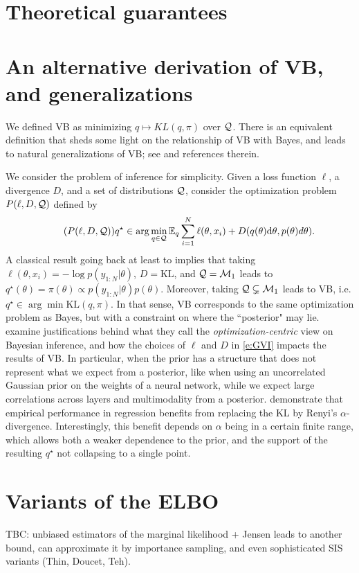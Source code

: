 \section{Theoretical guarantees}

\section{An alternative derivation of VB, and generalizations}
We defined VB as minimizing $q\mapsto KL(q,\pi)$ over $\mathcal{Q}$. 
There is an equivalent definition that sheds some light on the relationship of VB with Bayes, and leads to natural generalizations of VB; see \citep{KnJeDa22} and references therein.

We consider the problem of inference for simplicity. 
Given a loss function $\ell$, a divergence $D$, and a set of distributions $\mathcal{Q}$, consider the optimization problem $P(\ell, D, \mathcal{Q})$ defined by 
\begin{equation}
  \label{e:GVI}
  \tag{$P(\ell, D, \cQ)$}
  q^\star \in \arg\min_{q\in \cQ} \mathbb{E}_q \sum_{i=1}^N \ell(\theta, x_i) + D(q(\theta)\d\theta, p(\theta)d\theta).
\end{equation}
A classical result going back at least to \citep{DoVa75} implies that taking $\ell(\theta, x_i) = -\log p(y_{1:N}\vert \theta)$, $D=\text{KL}$, and $\mathcal{Q}=\mathcal{M}_1$ leads to $q^\star(\theta) = \pi(\theta) \propto p(y_{1:N}\vert\theta)p(\theta)$.
Moreover, taking $\mathcal{Q}\subsetneq \mathcal{M}_1$ leads to VB, i.e. $q^\star \in \arg\min \text{KL}(q,\pi)$.
In that sense, VB corresponds to the same optimization problem as Bayes, but with a constraint on where the ``posterior" may lie.  
\cite{KnJeDa22} examine justifications behind what they call the \emph{optimization-centric} view on Bayesian inference, and how the choices of $\ell$ and $D$ in \eqref{e:GVI} impacts the results of VB.
In particular, when the prior has a structure that does not represent what we expect from a posterior, like when using an uncorrelated Gaussian prior on the weights of a neural network, while we expect large correlations across layers and multimodality from a posterior.
\cite{KnJeDa22} demonstrate that empirical performance in regression benefits from replacing the KL by Renyi's $\alpha$-divergence. 
Interestingly, this benefit depends on $\alpha$ being in a certain finite range, which allows both a weaker dependence to the prior, and the support of the resulting $q^\star$ not collapsing to a single point.

\section{Variants of the ELBO}
TBC: unbiased estimators of the marginal likelihood + Jensen leads to another bound, can approximate it by importance sampling, and even sophisticated SIS variants (Thin, Doucet, Teh).